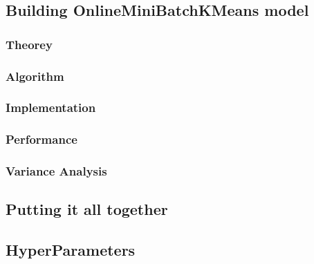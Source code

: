 \documentclass[final,leqno,onefignum,onetabnum]{siamltexmm}
\begin{document}
\subsection{Building OnlineMiniBatchKMeans model}
\subsubsection{Theorey}
\subsubsection{Algorithm}
\subsubsection{Implementation}
\subsubsection{Performance}
\subsubsection{Variance Analysis}
\subsection{Putting it all together}
\subsection{HyperParameters}

\newpage



\end{document}
